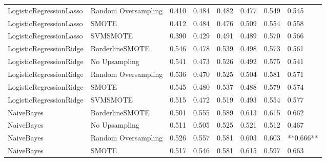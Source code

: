 \begin{tabular}{llllllll}
     LogisticRegressionLasso & Random Oversampling & 0.410 &                     0.484 &                 0.482 &                  0.477 &                                   0.549 &     0.545 \\
     LogisticRegressionLasso &               SMOTE & 0.412 &                     0.484 &                 0.476 &                  0.509 &                                   0.554 &     0.558 \\
     LogisticRegressionLasso &            SVMSMOTE & 0.390 &                     0.429 &                 0.491 &                  0.489 &                                   0.570 &     0.566 \\
     LogisticRegressionRidge &     BorderlineSMOTE & 0.546 &                     0.478 &                 0.539 &                  0.498 &                                   0.573 &     0.561 \\
     LogisticRegressionRidge &       No Upsampling & 0.541 &                     0.473 &                 0.526 &                  0.492 &                                   0.575 &     0.541 \\
     LogisticRegressionRidge & Random Oversampling & 0.536 &                     0.470 &                 0.525 &                  0.504 &                                   0.581 &     0.571 \\
     LogisticRegressionRidge &               SMOTE & 0.545 &                     0.480 &                 0.537 &                  0.488 &                                   0.579 &     0.574 \\
     LogisticRegressionRidge &            SVMSMOTE & 0.515 &                     0.472 &                 0.519 &                  0.493 &                                   0.554 &     0.577 \\
                  NaiveBayes &     BorderlineSMOTE & 0.501 &                     0.555 &                 0.589 &                  0.613 &                                   0.615 &     0.662 \\
                  NaiveBayes &       No Upsampling & 0.511 &                     0.505 &                 0.525 &                  0.521 &                                   0.512 &     0.467 \\
                  NaiveBayes & Random Oversampling & 0.526 &                     0.557 &                 0.581 &                  0.603 &                                   0.603 & **0.666** \\
                  NaiveBayes &               SMOTE & 0.517 &                     0.546 &                 0.581 &                  0.615 &                                   0.597 &     0.663 \\

\end{tabular}
